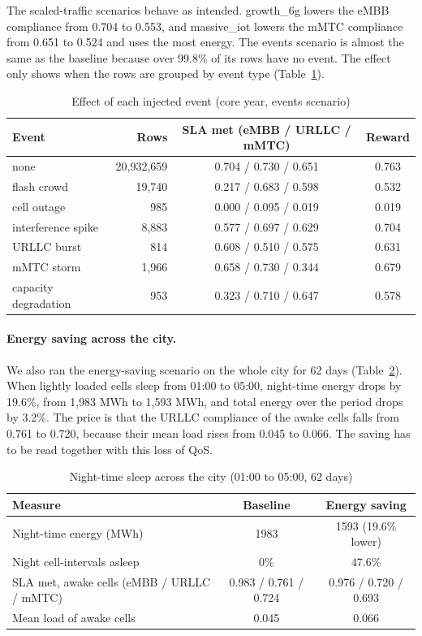 The scaled-traffic scenarios behave as intended. growth\_6g lowers the eMBB compliance from 0.704 to 0.553, and massive\_iot lowers the mMTC compliance from 0.651 to 0.524 and uses the most energy. The events scenario is almost the same as the baseline because over 99.8\% of its rows have no event. The effect only shows when the rows are grouped by event type (Table~\ref{tab:events}).

\begin{table}[htbp]
	\centering
	\caption{Effect of each injected event (core year, events scenario)}
	\label{tab:events}
	\small
	\begin{tabular}{|l|r|c|c|}
		\hline
		\textbf{Event} & \textbf{Rows} & \textbf{SLA met (eMBB / URLLC / mMTC)} & \textbf{Reward} \\
		\hline
		none & 20{,}932{,}659 & 0.704 / 0.730 / 0.651 & 0.763 \\
		flash crowd & 19{,}740 & 0.217 / 0.683 / 0.598 & 0.532 \\
		cell outage & 985 & 0.000 / 0.095 / 0.019 & 0.019 \\
		interference spike & 8{,}883 & 0.577 / 0.697 / 0.629 & 0.704 \\
		URLLC burst & 814 & 0.608 / 0.510 / 0.575 & 0.631 \\
		mMTC storm & 1{,}966 & 0.658 / 0.730 / 0.344 & 0.679 \\
		capacity degradation & 953 & 0.323 / 0.710 / 0.647 & 0.578 \\
		\hline
	\end{tabular}
\end{table}

\paragraph{Energy saving across the city.} We also ran the energy-saving scenario on the whole city for 62 days (Table~\ref{tab:energy}). When lightly loaded cells sleep from 01:00 to 05:00, night-time energy drops by 19.6\%, from 1{,}983 MWh to 1{,}593 MWh, and total energy over the period drops by 3.2\%. The price is that the URLLC compliance of the awake cells falls from 0.761 to 0.720, because their mean load rises from 0.045 to 0.066. The saving has to be read together with this loss of QoS.

\begin{table}[htbp]
	\centering
	\caption{Night-time sleep across the city (01:00 to 05:00, 62 days)}
	\label{tab:energy}
	\small
	\begin{tabular}{|l|c|c|}
		\hline
		\textbf{Measure} & \textbf{Baseline} & \textbf{Energy saving} \\
		\hline
		Night-time energy (MWh) & 1983 & 1593 (19.6\% lower) \\
		Night cell-intervals asleep & 0\% & 47.6\% \\
		SLA met, awake cells (eMBB / URLLC / mMTC) & 0.983 / 0.761 / 0.724 & 0.976 / 0.720 / 0.693 \\
		Mean load of awake cells & 0.045 & 0.066 \\
		\hline
	\end{tabular}
\end{table}


